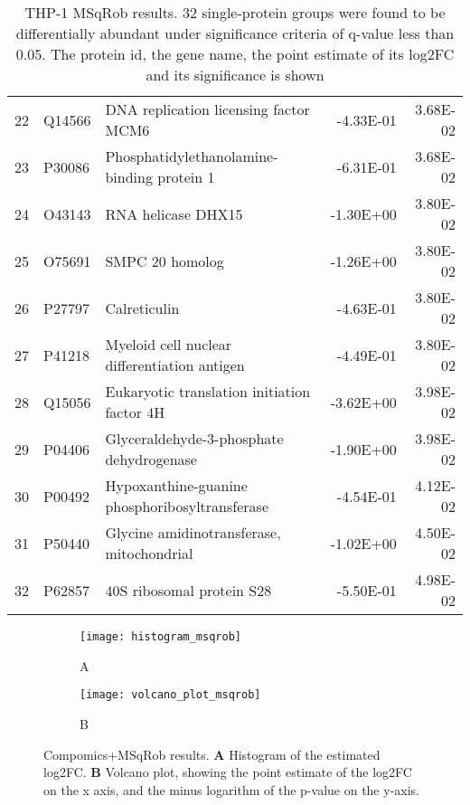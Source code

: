 \begin{table}[!h]
\begin{tabular}{rllrr}
  22 & Q14566 & DNA replication licensing factor MCM6 & -4.33E-01 & 3.68E-02 \\ 
  23 & P30086 & Phosphatidylethanolamine-binding protein 1 & -6.31E-01 & 3.68E-02 \\ 
  24 & O43143 & RNA helicase DHX15 & -1.30E+00 & 3.80E-02 \\ 
  25 & O75691 & SMPC 20 homolog & -1.26E+00 & 3.80E-02 \\ 
  26 & P27797 & Calreticulin & -4.63E-01 & 3.80E-02 \\ 
  27 & P41218 & Myeloid cell nuclear differentiation antigen & -4.49E-01 & 3.80E-02 \\ 
  28 & Q15056 & Eukaryotic translation initiation factor 4H & -3.62E+00 & 3.98E-02 \\ 
  29 & P04406 & Glyceraldehyde-3-phosphate dehydrogenase & -1.90E+00 & 3.98E-02 \\ 
  30 & P00492 & Hypoxanthine-guanine phosphoribosyltransferase & -4.54E-01 & 4.12E-02 \\ 
  31 & P50440 & Glycine amidinotransferase, mitochondrial & -1.02E+00 & 4.50E-02 \\ 
  32 & P62857 & 40S ribosomal protein S28 & -5.50E-01 & 4.98E-02 \\ 
   \hline
\end{tabular}
\caption{THP-1 MSqRob results. 32 single-protein groups were found to be differentially abundant under significance criteria of q-value less than 0.05. The protein id, the gene name, the point estimate of its \ac{log2FC} and its significance is shown}
\label{tab:thp1_rob_results}
\end{table}


\begin{figure}[!h]
\begin{subfigure}{0.45\textwidth}
\centering
\caption*{A}
\texttt{[image: histogram\_msqrob]}
\end{subfigure}
\begin{subfigure}{0.45\textwidth}
\centering
\caption*{B}
\texttt{[image: volcano\_plot\_msqrob]}
\end{subfigure}
\caption[Compomics+MSqRob results on THP-1 dataset]{Compomics+MSqRob results. \textbf{A} Histogram of the estimated \ac{log2FC}. \textbf{B} Volcano plot, showing the point estimate of the \ac{log2FC} on the x axis, and the minus logarithm of the p-value on the y-axis.}
\label{fig:compomics_rob}
\end{figure}



